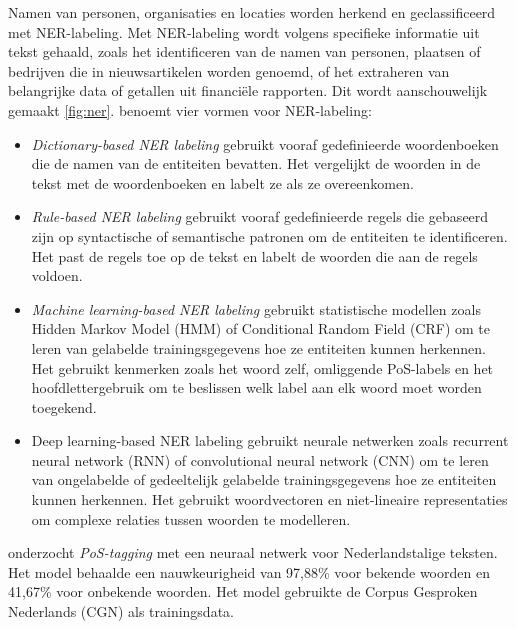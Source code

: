Namen van personen, organisaties en locaties worden herkend en geclassificeerd met NER-labeling. Met NER-labeling wordt volgens \textcite{Jurafsky2014} specifieke informatie uit tekst gehaald, zoals het identificeren van de namen van personen, plaatsen of bedrijven die in nieuwsartikelen worden genoemd, of het extraheren van belangrijke data of getallen uit financiële rapporten. Dit wordt aanschouwelijk gemaakt \ref{fig:ner}. \textcite{Li2018} benoemt vier vormen voor NER-labeling:

\begin{itemize}
		\item \textit{Dictionary-based NER labeling} gebruikt vooraf gedefinieerde woordenboeken die de namen van de entiteiten bevatten. Het vergelijkt de woorden in de tekst met de woordenboeken en labelt ze als ze overeenkomen.
		\item \textit{Rule-based NER labeling} gebruikt vooraf gedefinieerde regels die gebaseerd zijn op syntactische of semantische patronen om de entiteiten te identificeren. Het past de regels toe op de tekst en labelt de woorden die aan de regels voldoen.
		\item \textit{Machine learning-based NER labeling} gebruikt statistische modellen zoals Hidden Markov Model (HMM) of Conditional Random Field (CRF) om te leren van gelabelde trainingsgegevens hoe ze entiteiten kunnen herkennen. Het gebruikt kenmerken zoals het woord zelf, omliggende PoS-labels en het hoofdlettergebruik om te beslissen welk label aan elk woord moet worden toegekend.
		\item Deep learning-based NER labeling gebruikt neurale netwerken zoals recurrent neural network (RNN) of convolutional neural network (CNN) om te leren van ongelabelde of gedeeltelijk gelabelde trainingsgegevens hoe ze entiteiten kunnen herkennen. Het gebruikt woordvectoren en niet-lineaire representaties om complexe relaties tussen woorden te modelleren.
\end{itemize}


\textcite{Poel2008} onderzocht \textit{PoS-tagging} met een neuraal netwerk voor Nederlandstalige teksten. Het model behaalde een nauwkeurigheid van 97,88\% voor bekende woorden en 41,67\% voor onbekende woorden. Het model gebruikte de Corpus Gesproken Nederlands (CGN) als trainingsdata.

